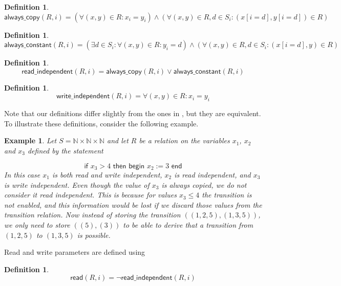 \documentclass{article}
\newtheorem{definition}[theorem]{Definition}
\newtheorem{example}[theorem]{Example}
\begin{document}
\begin{definition}
\[
\textsf{always\_copy}(R, i) = 
  (\forall (x, y) \in R: x_i = y_i) \land
  (\forall (x, y) \in R, d \in S_i: (x[i=d], y[i=d]) \in R)
\]
\end{definition}

\begin{definition}
\[
\textsf{always\_constant}(R, i) = 
  (\exists d \in S_i: \forall (x, y) \in R: y_i = d) \land
  (\forall (x, y) \in R, d \in S_i: (x[i=d], y) \in R)
\]
\end{definition}

\begin{definition}
\[
\textsf{read\_independent}(R, i) = 
\textsf{always\_copy}(R, i) \lor \textsf{always\_constant}(R, i)
\]
\end{definition}

\begin{definition}
\[
\textsf{write\_independent}(R, i) = 
  \forall (x, y) \in R: x_i = y_i
\]
\end{definition}

\noindent
Note that our definitions differ slightly from the ones in \cite{DBLP:conf/hvc/MeijerKBP14},
but they are equivalent. To illustrate these definitions, consider the
following example. 

\begin{example}
Let $S = \mathbb{N} \times \mathbb{N} \times \mathbb{N}$ and let $R$ be a relation on the variables $x_1$, $x_2$ and
$x_3$ defined by the statement

\[
\textsf{if } x_3 > 4 \textsf{ then begin } x_2 := 3 \textsf{ end}
\]
In this case $x_1$ is both read and write independent, $x_2$ is 
read independent, and $x_3$ is write independent. Even though the
value of $x_3$ is always copied, we do not consider it read independent. This is because for values $x_3 \leq 4$ the transition is not enabled,
and this information would be lost if we discard those values from
the transition relation. Now instead of storing the transition
$((1,2,5), (1,3,5))$, we only need to store $((5),(3))$ to be able
to derive that a transition from $(1,2,5)$ to $(1,3,5)$ is possible.
\end{example}

\noindent
Read and write parameters are defined using

\begin{definition}
\[
\textsf{read}(R, i) = 
\neg \textsf{read\_independent}(R, i)
\]
\end{definition}
\end{document}
